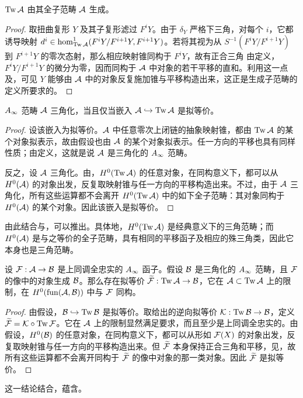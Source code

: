\begin{lemma}\label{st:3.32}
$\operatorname{Tw}\mathcal A$ 由其全子范畴 $\mathcal A$ 生成。
\end{lemma}
\begin{proof}
取扭曲复形 $Y$ 及其子复形滤过 $F^iY$。由于 $\delta_Y$ 严格下三角，对每个 $i$，它都诱导映射 $d^i\in\hom^1_{\operatorname{Tw}\mathcal A}(F^iY/F^{i+1}Y,F^{i+1}Y)$。若将其视为从 $S^{-1}(F^iY/F^{i+1}Y)$ 到 $F^{i+1}Y$ 的零次态射，那么相应映射锥同构于 $F^iY$，故有正合三角
由定义，$F^iY/F^{i+1}Y$ 的微分为零，因而同构于 $\mathcal A$ 中对象的若干平移的直和。利用这一点及，可见 $Y$ 能够由 $\mathcal A$ 中的对象反复施加锥与平移构造出来，这正是生成子范畴的定义所要求的。
\end{proof}

\begin{lemma}\label{st:3.33}
$A_\infty$ 范畴 $\mathcal A$ 三角化，当且仅当嵌入 $\mathcal A\hookrightarrow\operatorname{Tw}\mathcal A$ 是拟等价。
\end{lemma}
\begin{proof}
设该嵌入为拟等价。$\mathcal A$ 中任意零次上闭链的抽象映射锥，都由 $\operatorname{Tw}\mathcal A$ 的某个对象拟表示，故由假设也由 $\mathcal A$ 的某个对象拟表示。任一方向的平移也具有同样性质；由定义，这就是说 $\mathcal A$ 是三角化的 $A_\infty$ 范畴。

反之，设 $\mathcal A$ 三角化。由，$H^0(\operatorname{Tw}\mathcal A)$ 的任意对象，在同构意义下，都可以从 $H^0(\mathcal A)$ 的对象出发，反复取映射锥与任一方向的平移构造出来。不过，由于 $\mathcal A$ 三角化，所有这些运算都不会离开 $H^0(\operatorname{Tw}\mathcal A)$ 中的如下全子范畴：其对象同构于 $H^0(\mathcal A)$ 的某个对象。因此该嵌入是拟等价。
\end{proof}
由此结合与，可以推出。具体地，$H^0(\operatorname{Tw}\mathcal A)$ 是经典意义下的三角范畴；而 $H^0(\mathcal A)$ 是与之等价的全子范畴，具有相同的平移函子及相应的殊三角类，因此它本身也是三角范畴。

\begin{lemma}\label{st:3.34}
设 $\mathcal F:\mathcal A\to\mathcal B$ 是上同调全忠实的 $A_\infty$ 函子。假设 $\mathcal B$ 是三角化的 $A_\infty$ 范畴，且 $\mathcal F$ 的像中的对象生成 $\mathcal B$。那么存在拟等价 $\widetilde{\mathcal F}:\operatorname{Tw}\mathcal A\to\mathcal B$，它在 $\mathcal A\subset\operatorname{Tw}\mathcal A$ 上的限制，在 $H^0(\operatorname{fun}(\mathcal A,\mathcal B))$ 中与 $\mathcal F$ 同构。
\end{lemma}
\begin{proof}
由假设，$\mathcal B\hookrightarrow\operatorname{Tw}\mathcal B$ 是拟等价。取给出的逆向拟等价 $\mathcal K:\operatorname{Tw}\mathcal B\to\mathcal B$，定义 $\widetilde{\mathcal F}=\mathcal K\circ\operatorname{Tw}\mathcal F$。它在 $\mathcal A$ 上的限制显然满足要求，而且至少是上同调全忠实的。由假设，$H^0(\mathcal B)$ 的任意对象，在同构意义下，都可以从形如 $\mathcal F(X)$ 的对象出发，反复取映射锥与任一方向的平移构造出来。但 $\widetilde{\mathcal F}$ 本身保持正合三角和平移，见，故所有这些运算都不会离开同构于 $\widetilde{\mathcal F}$ 的像中对象的那一类对象。因此 $\widetilde{\mathcal F}$ 是拟等价。
\end{proof}
这一结论结合，蕴含。

